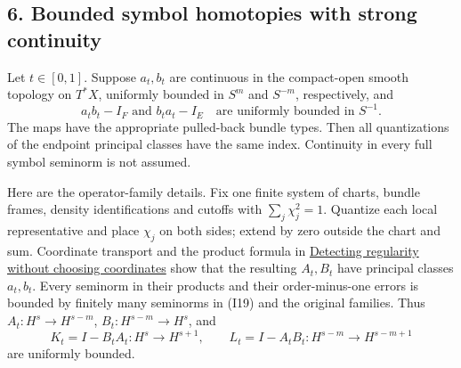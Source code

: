 \documentclass[
  11pt,
]{article}
\makeatletter
\let\ReaderOriginalAnchorStart\hyper@anchorstart
\let\ReaderOriginalAnchorEnd\hyper@anchorend
\let\ReaderPendingAliases\@empty
\def\ReaderArmAliases#1{\gdef\ReaderPendingAliases{#1}}
\def\hyper@anchorstart#1{\ReaderIfNativeAnchorTF{#1}{\ReaderPendingAliases\global\let\ReaderPendingAliases\@empty}{}\ReaderOriginalAnchorStart{#1}}
\makeatother
\begin{document}
\ReaderArmAliases{\ReaderOriginalAnchorStart{AN03-GSI-006}\ReaderOriginalAnchorEnd\begingroup\expandafter\def\csname @currentHref\endcsname{AN03-GSI-006}\label{AN03-GSI-006}\endgroup\ReaderOriginalAnchorStart{an03-gsi-006-bounded-symbol-homotopies-with-strong-continuity}\ReaderOriginalAnchorEnd\begingroup\expandafter\def\csname @currentHref\endcsname{an03-gsi-006-bounded-symbol-homotopies-with-strong-continuity}\label{an03-gsi-006-bounded-symbol-homotopies-with-strong-continuity}\endgroup\ReaderOriginalAnchorStart{6-bounded-symbol-homotopies-with-strong-continuity}\ReaderOriginalAnchorEnd\begingroup\expandafter\def\csname @currentHref\endcsname{6-bounded-symbol-homotopies-with-strong-continuity}\label{6-bounded-symbol-homotopies-with-strong-continuity}\endgroup}
\subsection{6. Bounded symbol homotopies with strong
continuity}\label{bounded-symbol-homotopies-with-strong-continuity}

Let \(t\in[0,1]\). Suppose \(a_t,b_t\) are continuous in the
compact-open smooth topology on \(T^*X\), uniformly bounded in \(S^m\)
and \(S^{-m}\), respectively, and \[
a_tb_t-I_F\text{ and }b_ta_t-I_E
\quad\text{are uniformly bounded in }S^{-1}.
\tag{I19}
\] The maps have the appropriate pulled-back bundle types. Then all
quantizations of the endpoint principal classes have the same index.
Continuity in every full symbol seminorm is not assumed.

Here are the operator-family details. Fix one finite system of charts,
bundle frames, density identifications and cutoffs with
\(\sum_j\chi_j^2=1\). Quantize each local representative and place
\(\chi_j\) on both sides; extend by zero outside the chart and sum.
Coordinate transport and the product formula in
\href{geometric-microlocal-calculus.pdf}{Detecting regularity without
choosing coordinates} show that the resulting \(A_t,B_t\) have principal
classes \(a_t,b_t\). Every seminorm in their products and their
order-minus-one errors is bounded by finitely many seminorms in (I19)
and the original families. Thus \(A_t:H^s\to H^{s-m}\),
\(B_t:H^{s-m}\to H^s\), and \[
K_t=I-B_tA_t:H^s\to H^{s+1},
\qquad
L_t=I-A_tB_t:H^{s-m}\to H^{s-m+1}
\tag{I20}
\] are uniformly bounded.
\end{document}
